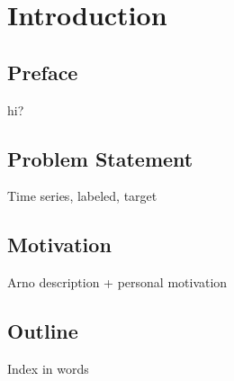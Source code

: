 \section{Introduction}
	\subsection{Preface}
		hi?
	\subsection{Problem Statement}
		Time series, labeled, target
	\subsection{Motivation}
		Arno description + personal motivation
	\subsection{Outline}
		Index in words
